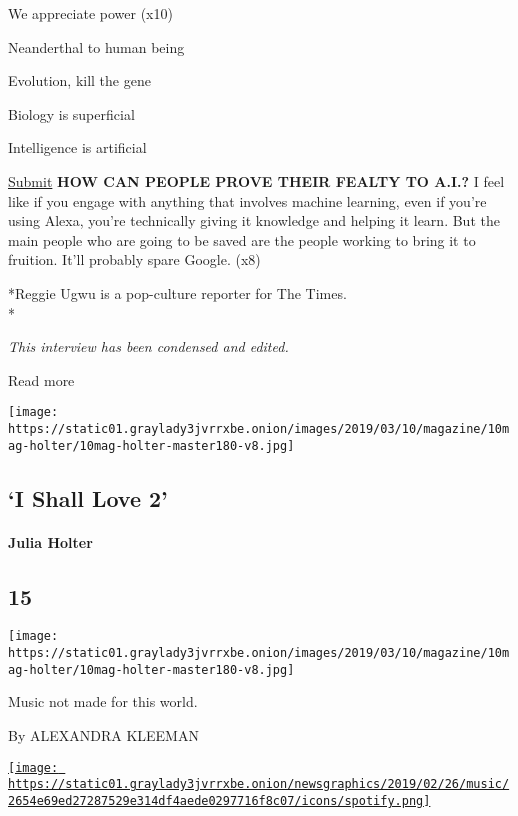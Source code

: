 We appreciate power (x10)

Neanderthal to human being

Evolution, kill the gene

Biology is superficial

Intelligence is artificial

\href{http://nytimes3xbfgragh.onion\#tooltip-6}{Submit} \textbf{HOW CAN
PEOPLE PROVE THEIR FEALTY TO A.I.?} I feel like if you engage with
anything that involves machine learning, even if you're using Alexa,
you're technically giving it knowledge and helping it learn. But the
main people who are going to be saved are the people working to bring it
to fruition. It'll probably spare Google. (x8)

*Reggie Ugwu is a pop-culture reporter for The Times.\\
*

\emph{This interview has been condensed and edited.}

Read more

\texttt{[image: https://static01.graylady3jvrrxbe.onion/images/2019/03/10/magazine/10mag-holter/10mag-holter-master180-v8.jpg]}

\hypertarget{--i-shall-love-2}{%
\subsection{\texorpdfstring{ `I Shall Love
2'}{  `I Shall Love 2'}}\label{--i-shall-love-2}}

\hypertarget{julia-holter}{%
\paragraph{Julia Holter}\label{julia-holter}}

\hypertarget{15}{%
\subsection{15}\label{15}}

\texttt{[image: https://static01.graylady3jvrrxbe.onion/images/2019/03/10/magazine/10mag-holter/10mag-holter-master180-v8.jpg]}

Music not made for this world.

By ALEXANDRA KLEEMAN

\href{https://open.spotify.com/track/4VxGlr9PawFDaThx20USnS}{\texttt{[image: https://static01.graylady3jvrrxbe.onion/newsgraphics/2019/02/26/music/2654e69ed27287529e314df4aede0297716f8c07/icons/spotify.png]}}


